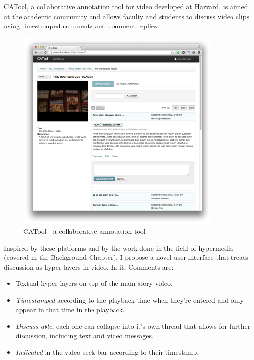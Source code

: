 CATool\cite{catool}, a collaborative annotation tool for video developed at Harvard, is aimed at the academic community and allows faculty and students to discuss video clips using timestamped comments and comment replies.

   \begin{figure}[thpb]
      \centering
      \includegraphics[width=4in]{figures/catool.png}
      \caption{CATool\cite{catool} - a collaborative annotation tool}
      \label{fig_catool}
   \end{figure}

Inspired by these platforms and by the work done in the field of hypermedia (covered in the Background Chapter), I propose a novel user interface that treats discussion as hyper layers in video. In it, Comments are: 

\begin{itemize}

\item Textual hyper layers on top of the main story video. 

\item \textit{Timestamped} according to the playback time when they're entered and only appear in that time in the playback. 

\item \textit{Discuss-able}, each one can collapse into it's own thread that allows for further discussion, including text and video messages. 

\item \textit{Indicated} in the video seek bar according to their timestamp.

\end{itemize}

